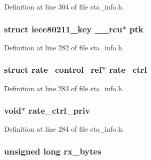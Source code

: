 Definition at line 304 of file sta\-\_\-info.\-h.

\hypertarget{structsta__info_a20cca2acd1f1b3a9435094e1f0b73092}{
\subsubsection[{ptk}]{\setlength{\rightskip}{0pt plus 5cm}struct {\bf ieee80211\-\_\-key} \-\_\-\-\_\-rcu$\ast$ ptk}}\label{structsta__info_a20cca2acd1f1b3a9435094e1f0b73092}


Definition at line 282 of file sta\-\_\-info.\-h.

\hypertarget{structsta__info_a0f6ac21a75ada1908328210ec3b42667}{
\subsubsection[{rate\-\_\-ctrl}]{\setlength{\rightskip}{0pt plus 5cm}struct {\bf rate\-\_\-control\-\_\-ref}$\ast$ rate\-\_\-ctrl}}\label{structsta__info_a0f6ac21a75ada1908328210ec3b42667}


Definition at line 283 of file sta\-\_\-info.\-h.

\hypertarget{structsta__info_a4212dd3a8398e8cd2ccb74821fc2fad0}{
\subsubsection[{rate\-\_\-ctrl\-\_\-priv}]{\setlength{\rightskip}{0pt plus 5cm}void$\ast$ rate\-\_\-ctrl\-\_\-priv}}\label{structsta__info_a4212dd3a8398e8cd2ccb74821fc2fad0}


Definition at line 284 of file sta\-\_\-info.\-h.

\hypertarget{structsta__info_adfbb81d9e73e27eedc0750a0ea4cb7b7}{
\subsubsection[{rx\-\_\-bytes}]{\setlength{\rightskip}{0pt plus 5cm}unsigned long rx\-\_\-bytes}}\label{structsta__info_adfbb81d9e73e27eedc0750a0ea4cb7b7}


